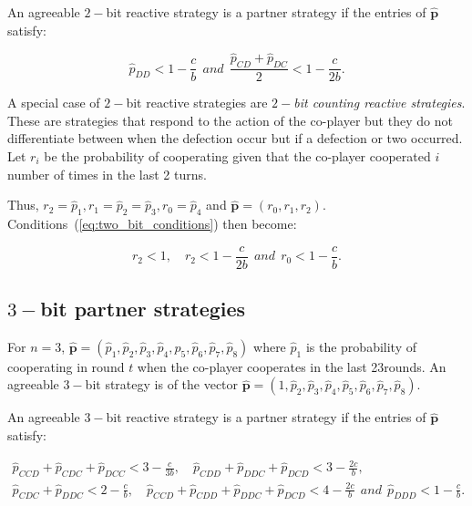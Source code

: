 \documentclass{article}
\theoremstyle{definition}
\begin{document}
An agreeable $2-$bit reactive strategy is a partner strategy if the entries of
$\mathbf{\hat{p}}$ satisfy:

\begin{equation}\label{eq:two_bit_conditions}
  \displaystyle \hat{p}_{DD} < 1\!-\! \frac{c}{b}  ~~and~~ \displaystyle \frac{\hat{p}_{CD} + \hat{p}_{DC}}{2} < 1-\frac{c}{2b}.
\end{equation}

A special case of $2-$bit reactive strategies are {\it  $2-$bit counting
reactive strategies}. These are strategies that respond to the action of the
co-player but they do not differentiate between when the defection occur but if
a defection or two occurred. Let $r_i$ be the probability of cooperating given
that the co-player cooperated $i$ number of times in the last 2 turns.

Thus, $r_2 = \hat{p}_1, r_1 = \hat{p}_2 =  \hat{p}_3, r_0 = \hat{p}_4$ and
$\mathbf{\hat{p}}=(r_0, r_1, r_2)$.
Conditions~(\ref{eq:two_bit_conditions}) then become:

\begin{equation}\label{eq:counting_two_bit_conditions}
  \displaystyle r_2 < 1, \quad r_2 < 1-\frac{c}{2b} ~~and~~ r_0 < 1\!-\! \frac{c}{b}.
\end{equation}

\subsection{$3-$bit partner strategies}

For $n=3$, $\mathbf{\hat{p}}=(\hat{p}_1, \hat{p}_2, \hat{p}_3, \hat{p}_4,
\hat{p}_5, \hat{p}_6, \hat{p}_7, \hat{p}_8)$ where $\hat{p}_1$ is the
probability of cooperating in round $t$ when the co-player cooperates in the
last 23rounds. An agreeable $3-$bit strategy is of the vector
$\mathbf{\hat{p}}=(1, \hat{p}_2, \hat{p}_3, \hat{p}_4, \hat{p}_5, \hat{p}_6,
\hat{p}_7, \hat{p}_8)$.

An agreeable $3-$bit reactive strategy is a partner strategy if the entries of
$\mathbf{\hat{p}}$ satisfy:

\begin{align}\label{eq:three_bit_conditions}
  \hat{p}_{CCD} + \hat{p}_{CDC} + \hat{p}_{DCC} < 3\!-\! \frac{c}{3b}, \quad 
  \hat{p}_{CDD} + \hat{p}_{DDC} + \hat{p}_{DCD} < 3\!-\! \frac{2c}{b}, \quad \\
  \hat{p}_{CDC} + \hat{p}_{DDC} < 2\!-\! \frac{c}{b}, \quad \hat{p}_{CCD} + \hat{p}_{CDD} + \hat{p}_{DDC} +  \hat{p}_{DCD} < 4\!-\! \frac{2c}{b} ~~and~~ \hat{p}_{DDD} < 1\!-\! \frac{c}{b}.
\end{align}
\end{document}
